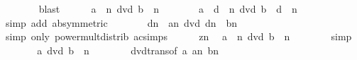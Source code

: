 \begin{isabellebody}
\ \ \ \ \ \ \isamarkupfalse%
\ blast\isanewline
\ \ \ \ \isamarkupfalse%
\ {\isachardoublequoteopen}a\ {\isacharcircum}{\kern0pt}\ n\ dvd\ b\ {\isacharcircum}{\kern0pt}\ n{\isachardoublequoteclose}\isanewline
\ \ \ \ \isamarkupfalse%
\ \isamarkupfalse%
\ {\isachardoublequoteopen}{\isacharparenleft}{\kern0pt}a{\isacharprime}{\kern0pt}\ {\isacharasterisk}{\kern0pt}\ {\isacharquery}{\kern0pt}d{\isacharparenright}{\kern0pt}\ {\isacharcircum}{\kern0pt}\ n\ dvd\ {\isacharparenleft}{\kern0pt}b{\isacharprime}{\kern0pt}\ {\isacharasterisk}{\kern0pt}\ {\isacharquery}{\kern0pt}d{\isacharparenright}{\kern0pt}\ {\isacharcircum}{\kern0pt}\ n{\isachardoublequoteclose}\isanewline
\ \ \ \ \ \ \isamarkupfalse%
\ {\isacharparenleft}{\kern0pt}simp\ add{\isacharcolon}{\kern0pt}\ ab{\isacharprime}{\kern0pt}{\isacharparenleft}{\kern0pt}{}{\isacharcomma}{\kern0pt}{}{\isacharparenright}{\kern0pt}{\isacharbrackleft}{\kern0pt}symmetric{\isacharbrackright}{\kern0pt}{\isacharparenright}{\kern0pt}\isanewline
\ \ \ \ \isamarkupfalse%
\ \isamarkupfalse%
\ {\isachardoublequoteopen}{\isacharquery}{\kern0pt}d{\isacharcircum}{\kern0pt}n\ {\isacharasterisk}{\kern0pt}\ a{\isacharprime}{\kern0pt}{\isacharcircum}{\kern0pt}n\ dvd\ {\isacharquery}{\kern0pt}d{\isacharcircum}{\kern0pt}n\ {\isacharasterisk}{\kern0pt}\ b{\isacharprime}{\kern0pt}{\isacharcircum}{\kern0pt}n{\isachardoublequoteclose}\isanewline
\ \ \ \ \ \ \isamarkupfalse%
\ {\isacharparenleft}{\kern0pt}simp\ only{\isacharcolon}{\kern0pt}\ power{\isacharunderscore}{\kern0pt}mult{\isacharunderscore}{\kern0pt}distrib\ ac{\isacharunderscore}{\kern0pt}simps{\isacharparenright}{\kern0pt}\isanewline
\ \ \ \ \isamarkupfalse%
\ zn\ \isamarkupfalse%
\ {\isachardoublequoteopen}a{\isacharprime}{\kern0pt}\ {\isacharcircum}{\kern0pt}\ n\ dvd\ b{\isacharprime}{\kern0pt}\ {\isacharcircum}{\kern0pt}\ n{\isachardoublequoteclose}\isanewline
\ \ \ \ \ \ \isamarkupfalse%
\ simp\isanewline
\ \ \ \ \isamarkupfalse%
\ \isamarkupfalse%
\ {\isachardoublequoteopen}a{\isacharprime}{\kern0pt}\ dvd\ b{\isacharprime}{\kern0pt}\ {\isacharcircum}{\kern0pt}\ n{\isachardoublequoteclose}\isanewline
\ \ \ \ \ \ \isamarkupfalse%
\ dvd{\isacharunderscore}{\kern0pt}trans{\isacharbrackleft}{\kern0pt}of\ a{\isacharprime}{\kern0pt}\ {\isachardoublequoteopen}a{\isacharprime}{\kern0pt}{\isacharcircum}{\kern0pt}n{\isachardoublequoteclose}\ {\isachardoublequoteopen}b{\isacharprime}{\kern0pt}{\isacharcircum}{\kern0pt}n{\isachardoublequoteclose}{\isacharbrackright}{\kern0pt}\ \isamarkupfalse%

\end{isabellebody}
